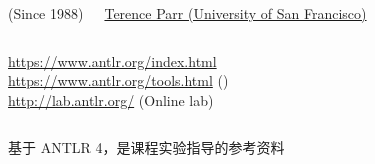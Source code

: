 \begin{frame}{}
  \begin{columns}
    \begin{center}
      (Since 1988)
    \end{center}
    \begin{center}
      \href{https://parrt.cs.usfca.edu/}{\small Terence Parr (University of San Francisco)}
    \end{center}
  \end{columns}

  \vspace{0.80cm}
  \begin{center}
    \url{https://www.antlr.org/index.html} \\[5pt]
    \url{https://www.antlr.org/tools.html} () \\[5pt]
    \url{http://lab.antlr.org/} (Online lab)
  \end{center}
\end{frame}


\begin{frame}{}
  \begin{columns}
  \end{columns}

  \vspace{0.50cm}
  \begin{center}
    基于 ANTLR 4，是课程实验指导的参考资料
  \end{center}
\end{frame}

